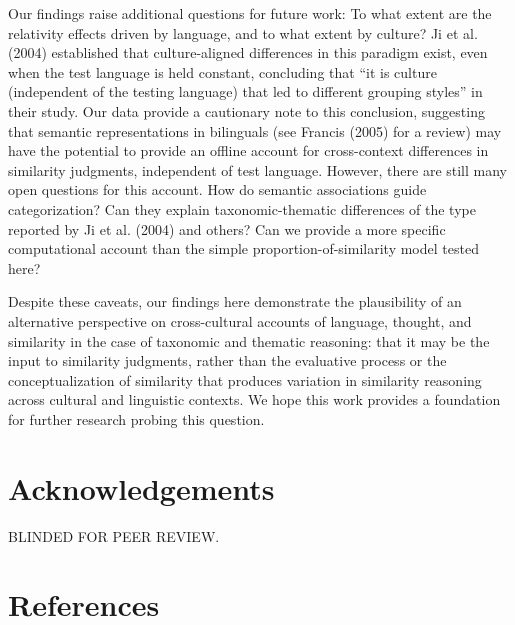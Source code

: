 \documentclass[10pt, letterpaper]{article}
\begin{document}
Our findings raise additional questions for future work: To what extent
are the relativity effects driven by language, and to what extent by
culture? Ji et al. (2004) established that culture-aligned differences
in this paradigm exist, even when the test language is held constant,
concluding that ``it is culture (independent of the testing language)
that led to different grouping styles'' in their study. Our data provide
a cautionary note to this conclusion, suggesting that semantic
representations in bilinguals (see Francis (2005) for a review) may have
the potential to provide an offline account for cross-context
differences in similarity judgments, independent of test language.
However, there are still many open questions for this account. How do
semantic associations guide categorization? Can they explain
taxonomic-thematic differences of the type reported by Ji et al. (2004)
and others? Can we provide a more specific computational account than
the simple proportion-of-similarity model tested here?

Despite these caveats, our findings here demonstrate the plausibility of
an alternative perspective on cross-cultural accounts of language,
thought, and similarity in the case of taxonomic and thematic reasoning:
that it may be the input to similarity judgments, rather than the
evaluative process or the conceptualization of similarity that produces
variation in similarity reasoning across cultural and linguistic
contexts. We hope this work provides a foundation for further research
probing this question.

\hypertarget{acknowledgements}{%
\section{Acknowledgements}\label{acknowledgements}}

BLINDED FOR PEER REVIEW.

\hypertarget{references}{%
\section{References}\label{references}}

\setlength{\parindent}{-0.1in} 
\setlength{\leftskip}{0.125in}

\noindent

\newpage
\end{document}
